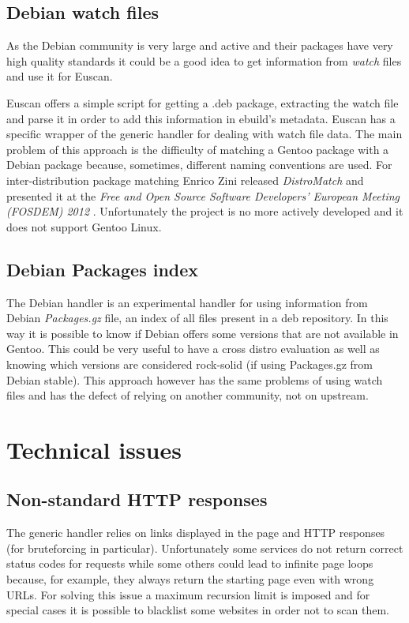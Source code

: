 \subsection{Debian watch files}
As the Debian community is very large and active and their packages have very high quality standards it could be a good idea to get information from \emph{watch} files and use it for Euscan.

Euscan offers a simple script for getting a .deb package, extracting the watch file and parse it in order to add this information in ebuild's metadata.
Euscan has a specific wrapper of the generic handler for dealing with watch file data.
The main problem of this approach is the difficulty of matching a Gentoo package with a Debian package because, sometimes, different naming conventions are used. For inter-distribution package matching Enrico Zini released \emph{DistroMatch} \cite{distromatch} and presented it at the \emph{Free and Open Source Software Developers' European Meeting (FOSDEM) 2012} \cite{distromatch_fosdem}. Unfortunately the project is no more actively \cite{distromatch_away} developed and it does not support Gentoo Linux.


\subsection{Debian Packages index}
The Debian handler is an experimental handler for using information from Debian \emph{Packages.gz} file, an index of all files present in a deb repository. In this way it is possible to know if Debian offers some versions that are not available in Gentoo. This could be very useful to have a cross distro evaluation as well as knowing which versions are considered rock-solid (if using Packages.gz from Debian stable).
This approach however has the same problems of using watch files and has the defect of relying on another community, not on upstream.

\section{Technical issues}
\subsection{Non-standard HTTP responses}
The generic handler relies on links displayed in the page and HTTP responses (for bruteforcing in particular). Unfortunately some services do not return correct status codes for requests while some others could lead to infinite page loops because, for example, they always return the starting page even with wrong URLs.
For solving this issue a maximum recursion limit is imposed and for special cases it is possible to blacklist some websites in order not to scan them.

